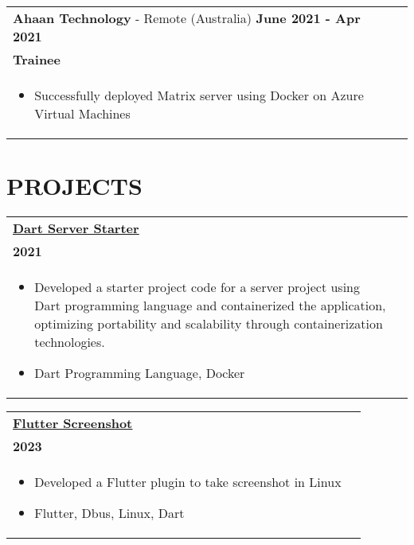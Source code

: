 \documentclass[a4paper,8pt]{article}
\begin{document}
\begin{tabularx}{\linewidth}{ @{}l r@{} }
\textbf{Ahaan Technology} - Remote (Australia) \hfill \textbf{June 2021 - Apr 2021} \\[4pt]
\textbf{Trainee} \\[4pt]
\begin{minipage}[t]{\linewidth}
    \begin{itemize}[nosep,after=\strut, leftmargin=1em, itemsep=2pt]
        \item Successfully deployed Matrix server using Docker on Azure Virtual Machines
    \end{itemize}
\end{minipage}
\end{tabularx}

\section{\textbf{PROJECTS}}
\begin{tabularx}{\linewidth}{ @{}l r@{} }
\textbf{\underline{\href{https://github.com/aadarshadhakalg/dart-server-starter}{Dart Server Starter}}} \\[4pt]
\textbf{2021} \\[4pt]
\begin{minipage}[t]{\linewidth}
    \begin{itemize}[nosep,after=\strut, leftmargin=1em, itemsep=2pt]
        \item Developed a starter project code for a server project using Dart programming language and containerized the application, optimizing portability and scalability through containerization technologies.
        \item Dart Programming Language, Docker
    \end{itemize}
\end{minipage}
\end{tabularx}

\begin{tabularx}{\linewidth}{ @{}l r@{} }
\textbf{\underline{\href{https://github.com/aadarshadhakalg/flutter_screenshotx}{Flutter Screenshot}}} \\[4pt]
\textbf{2023} \\[4pt]
\begin{minipage}[t]{\linewidth}
    \begin{itemize}[nosep,after=\strut, leftmargin=1em, itemsep=2pt]
        \item Developed a Flutter plugin to take screenshot in Linux
        \item Flutter, Dbus, Linux, Dart
    \end{itemize}
\end{minipage}
\end{tabularx}
\end{document}
